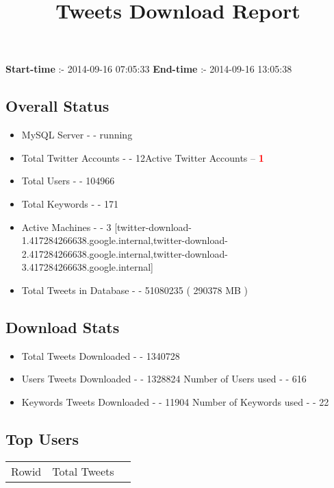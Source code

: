 \documentclass{article}\usepackage[T1]{fontenc}
\begin{document}
\title{\textbf{Tweets Download Report}}
               \date{}
                \maketitle
               \centerline{\textbf{Start-time} :- 2014-09-16 07:05:33 \hspace{40pt} \textbf{End-time} :- 2014-09-16 13:05:38}               \subsection*{Overall Status}                \begin{itemize}                \item MySQL Server - - running               \item Total Twitter Accounts - - 12\newline Active Twitter Accounts -- \textcolor{red}{\textbf{1}}               \item Total Users - - 104966               \item Total Keywords - - 171               \item Active Machines - - 3 [twitter-download-1.417284266638.google.internal,twitter-download-2.417284266638.google.internal,twitter-download-3.417284266638.google.internal]               \item Total Tweets in Database - - 51080235 ( 290378 MB )               \end{itemize}               \subsection*{Download Stats}                \begin{itemize}                \item Total Tweets Downloaded - - 1340728               \item Users Tweets Downloaded - - 1328824 \newline Number of Users used - - 616               \item Keywords Tweets Downloaded - - 11904 \newline Number of Keywords used - - 22              \end{itemize}              \subsection*{Top Users}\begin{tabular}{|c|c|c|}         \hline         Rowid & Total Tweets \\ 

\end{tabular}
\end{document}
